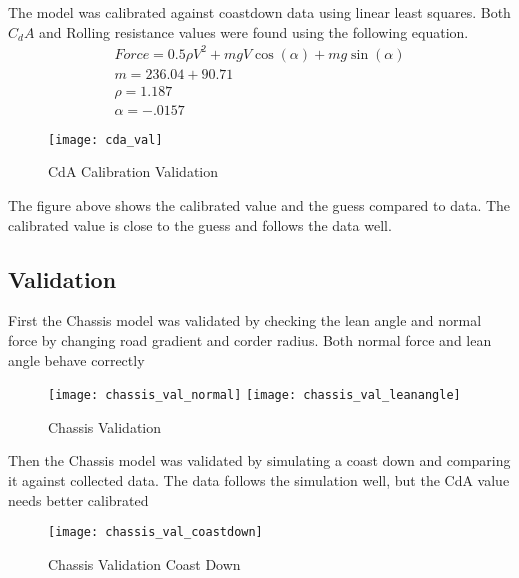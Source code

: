 \documentclass[../SimBALink.tex]{subfiles}
\begin{document}
The model was calibrated against coastdown data using linear least squares. Both $C_dA$ and Rolling resistance values were found using the following equation.
\begin{gather}
	Force = 0.5\rho V^2 + mgV\cos(\alpha) + mg\sin(\alpha) \\
	m = 236.04 + 90.71 \\
	\rho = 1.187 \\
	\alpha = -.0157
\end{gather}

\begin{figure}[H]
  \centering
  \texttt{[image: cda\_val]}
  \caption{CdA Calibration Validation}
\end{figure}

The figure above shows the calibrated value and the guess compared to data. The calibrated value is close to the guess and follows the data well.



\subsection{Validation}

First the Chassis model was validated by checking the lean angle and normal force by changing road gradient and corder radius. Both normal force and lean angle behave correctly

\begin{figure}[H]
\center
  \texttt{[image: chassis\_val\_normal]}
  \texttt{[image: chassis\_val\_leanangle]}
  \caption{Chassis Validation}
\end{figure}

Then the Chassis model was validated by simulating a coast down and comparing it against collected data. The data follows the simulation well, but the CdA value needs better calibrated

\begin{figure}[H]
\center
 \texttt{[image: chassis\_val\_coastdown]}
  \caption{Chassis Validation Coast Down}
\end{figure}
\end{document}
